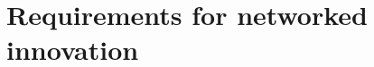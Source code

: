 \documentclass{beamer}
\begin{document}

\section{Requirements for networked innovation} %
\end{document}
